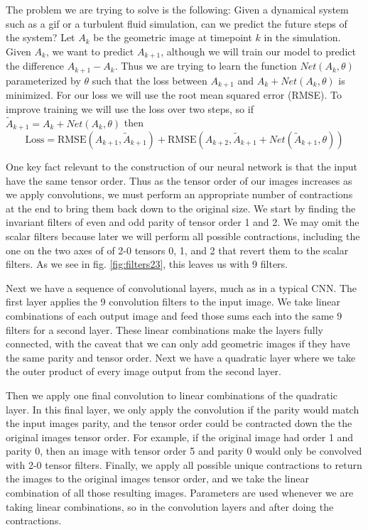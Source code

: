 \documentclass{article}
\theoremstyle{definition}
\begin{document}
The problem we are trying to solve is the following: Given a dynamical system such as a gif or a turbulent fluid simulation, can we predict the future steps of the system? Let $A_k$ be the geometric image at timepoint $k$ in the simulation. Given $A_k$, we want to predict $A_{k+1}$, although we will train our model to predict the difference $A_{k+1} - A_k$. Thus we are trying to learn the function $Net(A_k, \theta)$ parameterized by $\theta$ such that the loss between $A_{k+1}$ and $A_k + Net(A_k, \theta)$ is minimized. For our loss we will use the root mean squared error (RMSE). To improve training we will use the loss over two steps, so if $\widetilde{A}_{k+1} = A_k + Net(A_k, \theta)$ then
$$\text{Loss} = \text{RMSE}(A_{k+1}, \widetilde{A}_{k+1}) + \text{RMSE}(A_{k+2}, \widetilde{A}_{k+1} + Net(\widetilde{A}_{k+1}, \theta))$$

One key fact relevant to the construction of our neural network is that the input have the same tensor order. Thus as the tensor order of our images increases as we apply convolutions, we must perform an appropriate number of contractions at the end to bring them back down to the original size. We start by finding the invariant filters of even and odd parity of tensor order 1 and 2. We may omit the scalar filters because later we will perform all possible contractions, including the one on the two axes of of 2-0 tensors 0, 1, and 2 that revert them to the scalar filters. As we see in fig. \ref{fig:filters23}, this leaves us with 9 filters.

Next we have a sequence of convolutional layers, much as in a typical CNN. The first layer applies the 9 convolution filters to the input image. We take linear combinations of each output image and feed those sums each into the same 9 filters for a second layer. These linear combinations make the layers fully connected, with the caveat that we can only add geometric images if they have the same parity and tensor order. Next we have a quadratic layer where we take the outer product of every image output from the second layer.

Then we apply one final convolution to linear combinations of the quadratic layer. In this final layer, we only apply the convolution if the parity would match the input images parity, and the tensor order could be contracted down the the original images tensor order. For example, if the original image had order 1 and parity 0, then an image with tensor order 5 and parity 0 would only be convolved with 2-0 tensor filters. Finally, we apply all possible unique contractions to return the images to the original images tensor order, and we take the linear combination of all those resulting images. Parameters are used whenever we are taking linear combinations, so in the convolution layers and after doing the contractions.
\end{document}
